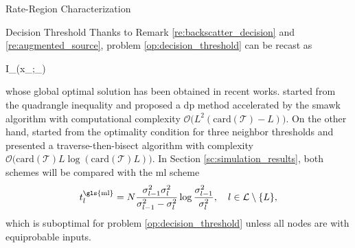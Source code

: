 \documentclass[journal]{IEEEtran}
\begin{document}
\begin{section}{Rate-Region Characterization}
\begin{subsection}{Decision Threshold}
		Thanks to Remark \ref{re:backscatter_decision} and \ref{re:augmented_source}, problem \eqref{op:decision_threshold} can be recast as
		\begin{maxi!}
			{}{I_{}(x_{};_{})}{\label{op:decision_threshold_discrete}}{\label{ob:decision_threshold_discrete}}
			\addConstraint{\eqref{co:sequential_threshold},}
		\end{maxi!}
		whose global optimal solution has been obtained in recent works.
		\cite{He2021} started from the quadrangle inequality and proposed a \gls{dp} method accelerated by the \gls{smawk} algorithm with computational complexity $\mathcal{O}\bigl(L^2(\mathrm{card}(\mathcal{T})-L)\bigr)$.
		On the other hand, \cite{Nguyen2020a} started from the optimality condition for three neighbor thresholds and presented a traverse-then-bisect algorithm with complexity $\mathcal{O}\bigl(\mathrm{card}(\mathcal{T})L\log(\mathrm{card}(\mathcal{T})L)\bigr)$.
		In Section \ref{sc:simulation_results}, both schemes will be compared with the \gls{ml} scheme \cite{Qian2019}
		\begin{equation}
			t_{l}^{\text{\gls{ml}}} = N \frac{\sigma_{l-1}^2 \sigma_{l}^2}{\sigma_{l-1}^2 - \sigma_{l}^2} \log \frac{\sigma_{l-1}^2}{\sigma_{l}^2}, \quad l \in \mathcal{L} \setminus \{L\},
			\label{eq:detection_threshold_ml}
		\end{equation}
		which is suboptimal for problem \eqref{op:decision_threshold} unless all nodes are with equiprobable inputs.
	\end{subsection}
\end{section}
\end{document}
